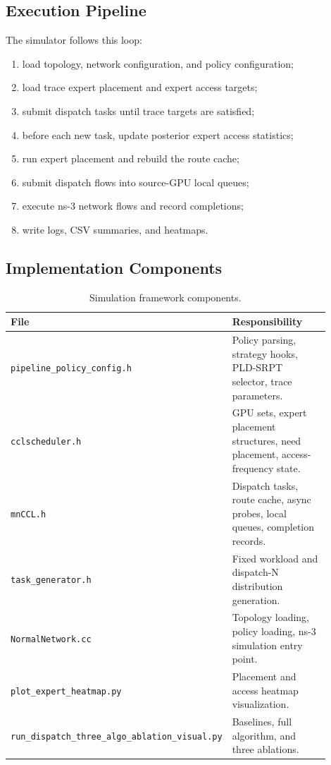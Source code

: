 \documentclass[10pt,conference]{IEEEtran}
\begin{document}
\subsection{Execution Pipeline}

The simulator follows this loop:
\begin{enumerate}
  \item load topology, network configuration, and policy configuration;
  \item load trace expert placement and expert access targets;
  \item submit dispatch tasks until trace targets are satisfied;
  \item before each new task, update posterior expert access statistics;
  \item run expert placement and rebuild the route cache;
  \item submit dispatch flows into source-GPU local queues;
  \item execute ns-3 network flows and record completions;
  \item write logs, CSV summaries, and heatmaps.
\end{enumerate}

\subsection{Implementation Components}

\begin{table}[t]
\centering
\caption{Simulation framework components.}
\label{tab:framework}
\small
\begin{tabular}{p{0.32\linewidth}p{0.58\linewidth}}
\toprule
\textbf{File} & \textbf{Responsibility}\\
\midrule
\texttt{pipeline\_policy\_config.h} & Policy parsing, strategy hooks, PLD-SRPT selector, trace parameters.\\
\texttt{cclscheduler.h} & GPU sets, expert placement structures, need placement, access-frequency state.\\
\texttt{mnCCL.h} & Dispatch tasks, route cache, async probes, local queues, completion records.\\
\texttt{task\_generator.h} & Fixed workload and dispatch-N distribution generation.\\
\texttt{NormalNetwork.cc} & Topology loading, policy loading, ns-3 simulation entry point.\\
\texttt{plot\_expert\_heatmap.py} & Placement and access heatmap visualization.\\
\texttt{run\_dispatch\_three\_algo\_ablation\_visual.py} & Baselines, full algorithm, and three ablations.\\
\bottomrule
\end{tabular}
\end{table}
\end{document}
